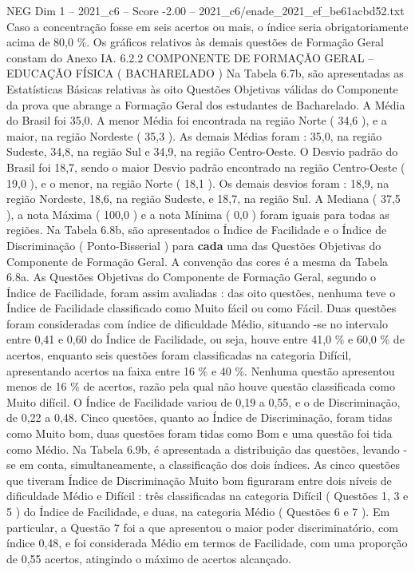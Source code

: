 \begin{textsample}{NEG Dim 1 – 2021\_c6 – Score -2.00 – 2021\_c6/enade\_2021\_ef\_be61acbd52.txt}
Caso a concentração fosse em seis acertos ou mais, o índice seria obrigatoriamente acima de 80,0 \%.
Os gráficos relativos às demais questões de Formação Geral constam do Anexo IA. 6.2.2 COMPONENTE DE FORMAÇÃO GERAL – EDUCAÇÃO FÍSICA ( BACHARELADO ) Na Tabela 6.7b, são apresentadas as Estatísticas Básicas relativas às oito Questões Objetivas válidas do Componente da prova que abrange a Formação Geral dos estudantes de Bacharelado.
A Média do Brasil foi 35,0.
A menor Média foi encontrada na região Norte ( 34,6 ), e a maior, na região Nordeste ( 35,3 ).
As demais Médias foram : 35,0, na região Sudeste, 34,8, na região Sul e 34,9, na região Centro-Oeste.
O Desvio padrão do Brasil foi 18,7, sendo o maior Desvio padrão encontrado na região Centro-Oeste ( 19,0 ), e o menor, na região Norte ( 18,1 ).
Os demais desvios foram : 18,9, na região Nordeste, 18,6, na região Sudeste, e 18,7, na região Sul.
A Mediana ( 37,5 ), a nota Máxima ( 100,0 ) e a nota Mínima ( 0,0 ) foram iguais para todas as regiões.
Na Tabela 6.8b, são apresentados o Índice de Facilidade e o Índice de Discriminação ( Ponto-Bisserial ) para \textbf{cada} uma das Questões Objetivas do Componente de Formação Geral.
A convenção das cores é a mesma da Tabela 6.8a.
As Questões Objetivas do Componente de Formação Geral, segundo o Índice de Facilidade, foram assim avaliadas : das oito questões, nenhuma teve o Índice de Facilidade classificado como Muito fácil ou como Fácil.
Duas questões foram consideradas com índice de dificuldade Médio, situando -se no intervalo entre 0,41 e 0,60 do Índice de Facilidade, ou seja, houve entre 41,0 \% e 60,0 \% de acertos, enquanto seis questões foram classificadas na categoria Difícil, apresentando acertos na faixa entre 16 \% e 40 \%.
Nenhuma questão apresentou menos de 16 \% de acertos, razão pela qual não houve questão classificada como Muito difícil.
O Índice de Facilidade variou de 0,19 a 0,55, e o de Discriminação, de 0,22 a 0,48.
Cinco questões, quanto ao Índice de Discriminação, foram tidas como Muito bom, duas questões foram tidas como Bom e uma questão foi tida como Médio.
Na Tabela 6.9b, é apresentada a distribuição das questões, levando -se em conta, simultaneamente, a classificação dos dois índices.
As cinco questões que tiveram Índice de Discriminação Muito bom figuraram entre dois níveis de dificuldade Médio e Difícil : três classificadas na categoria Difícil ( Questões 1, 3 e 5 ) do Índice de Facilidade, e duas, na categoria Médio ( Questões 6 e 7 ).
Em particular, a Questão 7 foi a que apresentou o maior poder discriminatório, com índice 0,48, e foi considerada Médio em termos de Facilidade, com uma proporção de 0,55 acertos, atingindo o máximo de acertos alcançado.

\end{textsample}
